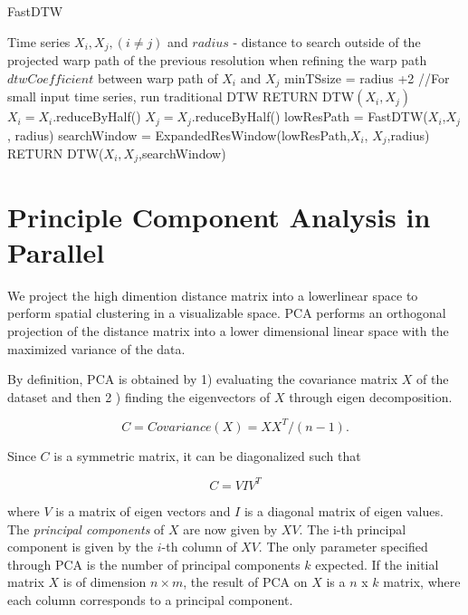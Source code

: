 \begin{algorithm}
	\caption{FastDTW }
	\label{alg:alg2}
	\begin{algorithmic}[1]
		\REQUIRE Time series $X_i, X_j, (i \neq j)$ and  $radius$ - distance to search outside of the projected warp path of the previous resolution when refining the warp path
		\ENSURE $dtwCoefficient$ between warp path of $X_i$ and $X_j$
		\STATE \textsf{minTSsize} = \textsf{radius} +2
		\STATE //For small input time series, run traditional DTW
		\STATE RETURN \textsf{DTW$(X_i, X_j)$}
		\ELSE
		\STATE \textsf{$X_i = X_i.$reduceByHalf()}
		\STATE \textsf{$X_j = X_j.$reduceByHalf()}
		\STATE \textsf{lowResPath = FastDTW($X_i$,$X_j$, radius)}
		\STATE \textsf{searchWindow = ExpandedResWindow(lowResPath,$X_i$, $X_j$,radius)}
		\STATE RETURN \textsf{DTW($X_i,X_j$,searchWindow)}
		\ENDIF
		
	\end{algorithmic}
\end{algorithm}



\section{Principle Component Analysis in Parallel}
We project the high dimention distance matrix into a lowerlinear space to perform spatial clustering in a visualizable space. PCA  performs an orthogonal projection of the distance matrix into a lower dimensional linear space with the maximized variance of the data.

By definition, PCA is obtained by 1) evaluating the covariance matrix $X$ of the dataset and then 2 ) finding the eigenvectors of $X$ through eigen decomposition.

$$ C = Covariance(X) = XX^T/(n-1).$$

Since $C$ is a symmetric matrix, it can be diagonalized such that 

$$ C = VIV^T $$

where $V$ is a matrix of eigen vectors and $I$ is a diagonal matrix of eigen values. The \textit{principal components} of $X$ are now given by $XV$. The i-th principal component is given by the $i$-th column of $XV$. The only parameter specified through PCA is the number of principal components $k$ expected. If the initial matrix $X$ is of dimension $n \times m$, the result of  PCA on $X$ is a $n$ x $k$ matrix, where each column corresponds to a principal component.


